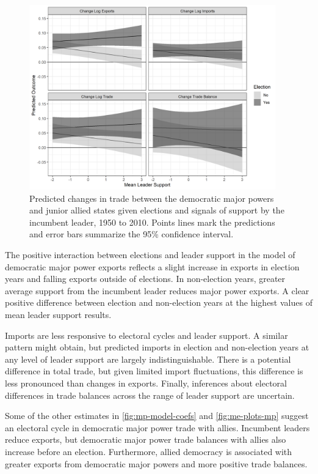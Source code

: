 \documentclass[12pt]{article}
\begin{document}
\begin{figure}[htpb]
	\centering
		\includegraphics[width=0.95\textwidth]{../figures/pred-mp-trade.png}
	\caption{Predicted changes in trade between the democratic major powers and junior allied states given elections and signals of support by the incumbent leader, 1950 to 2010. Points lines mark the predictions and error bars summarize the 95\% confidence interval.}
	\label{fig:me-plots-mp}
\end{figure}


The positive interaction between elections and leader support in the model of democratic major power exports reflects a slight increase in exports in election years and falling exports outside of elections. 
In non-election years, greater average support from the incumbent leader reduces major power exports. 
A clear positive difference between election and non-election years at the highest values of mean leader support results. 


Imports are less responsive to electoral cycles and leader support. 
A similar pattern might obtain, but predicted imports in election and non-election years at any level of leader support are largely indistinguishable. 
There is a potential difference in total trade, but given limited import fluctuations, this difference is less pronounced than changes in exports. 
Finally, inferences about electoral differences in trade balances across the range of leader support are uncertain.


Some of the other estimates in \autoref{fig:mp-model-coefs} and \autoref{fig:me-plots-mp} suggest an electoral cycle in democratic major power trade with allies.
Incumbent leaders reduce exports, but democratic major power trade balances with allies also increase before an election.
Furthermore, allied democracy is associated with greater exports from democratic major powers and more positive trade balances.
\end{document}
